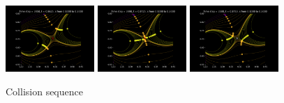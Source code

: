 \documentclass{article}
\begin{document}
	\begin{figure}[htbp]
		\centering
		\includegraphics[width=0.3\textwidth]{figures/Collision_sequence1.pdf}
		\includegraphics[width=0.3\textwidth]{figures/Collision_sequence2.pdf}
		\includegraphics[width=0.3\textwidth]{figures/Collision_sequence3.pdf}
		\caption{Collision sequence}
		\label{fig:collision sequence}
	\end{figure}
\end{document}
